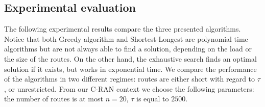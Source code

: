 \documentclass[10pt, conference, letterpaper]{IEEEtran}
\begin{document}
%        
%        
%        
%       
    \subsection{Experimental evaluation}\label{sec:exp_PAZL}
      The following experimental results compare the three presented algorithms.
      Notice that both Greedy algorithm and Shortest-Longest are polynomial time algorithms but are not always able to find a solution, depending on the load or the size of the routes. On the other hand, the exhaustive search finds an optimal solution if it exists, but works in exponential time. We compare the performance of the algorithms in two different regimes: routes are either short with regard to $\tau$, or unrestricted.
      From our C-RAN context we choose the following parameters: the number of routes is at most $n = 20$, $\tau$ is equal to $2500$.
\end{document}
